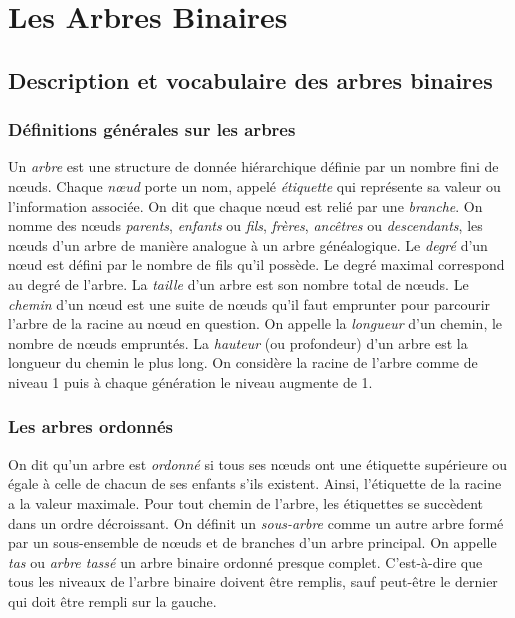 \documentclass{report}
\begin{document}
\section{Les Arbres Binaires}
\subsection{Description et vocabulaire des arbres binaires}
\subsubsection{Définitions générales sur les arbres}

Un \textit{arbre} est une structure de donnée hiérarchique définie par un nombre fini de nœuds. Chaque \textit{nœud} porte un nom, appelé \textit{étiquette} qui représente sa valeur ou l'information associée. On dit que chaque nœud est relié par une \textit{branche}. 
On nomme des nœuds \textit{parents}, \textit{enfants} ou \textit{fils}, \textit{frères}, \textit{ancêtres} ou \textit{descendants}, les nœuds d'un arbre de manière analogue à un arbre généalogique.
Le \textit{degré} d'un nœud est défini par le nombre de fils qu'il possède. Le degré maximal correspond au degré de l'arbre.
La \textit{taille} d'un arbre est son nombre total de nœuds.
Le \textit{chemin} d'un nœud est une suite de nœuds qu'il faut emprunter pour parcourir l'arbre de la racine au nœud en question. On appelle la \textit{longueur} d'un chemin, le nombre de nœuds empruntés.
La \textit{hauteur} (ou profondeur) d'un arbre est la longueur du chemin le plus long.
On considère la racine de l'arbre comme de niveau 1 puis à chaque génération le niveau augmente de 1.

\subsubsection{Les arbres ordonnés}

On dit qu'un arbre est \textit{ordonné} si tous ses nœuds ont une étiquette supérieure ou égale à celle de chacun de ses enfants s'ils existent. Ainsi, l'étiquette de la racine a la valeur maximale. Pour tout chemin de l'arbre, les étiquettes se succèdent dans un ordre décroissant.
On définit un \textit{sous-arbre} comme un autre arbre formé par un sous-ensemble de nœuds et de branches d'un arbre principal.
On appelle \textit{tas} ou \textit{arbre tassé} un arbre binaire ordonné presque complet. C'est-à-dire que tous les niveaux de l'arbre binaire doivent être remplis, sauf peut-être le dernier qui doit être rempli sur la gauche.
\end{document}
